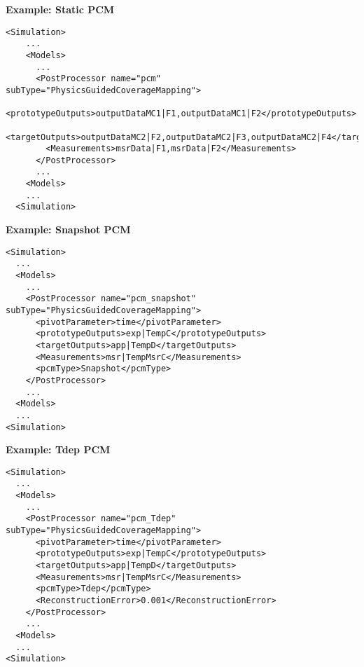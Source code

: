 \textbf{Example: Static PCM}
\begin{lstlisting}[style=XML,morekeywords={subType}]
  <Simulation>
    ...
    <Models>
      ...
      <PostProcessor name="pcm" subType="PhysicsGuidedCoverageMapping">
        <prototypeOutputs>outputDataMC1|F1,outputDataMC1|F2</prototypeOutputs>
        <targetOutputs>outputDataMC2|F2,outputDataMC2|F3,outputDataMC2|F4</targetOutputs>
        <Measurements>msrData|F1,msrData|F2</Measurements>
      </PostProcessor>
      ...
    <Models>
    ...
  <Simulation>
\end{lstlisting}

\textbf{Example: Snapshot PCM}
\begin{lstlisting}[style=XML,morekeywords={subType}]
<Simulation>
  ...
  <Models>
    ...
    <PostProcessor name="pcm_snapshot" subType="PhysicsGuidedCoverageMapping">
      <pivotParameter>time</pivotParameter>
      <prototypeOutputs>exp|TempC</prototypeOutputs>
      <targetOutputs>app|TempD</targetOutputs>
      <Measurements>msr|TempMsrC</Measurements>
      <pcmType>Snapshot</pcmType>
    </PostProcessor>
    ...
  <Models>
  ...
<Simulation>
\end{lstlisting}

\textbf{Example: Tdep PCM}
\begin{lstlisting}[style=XML,morekeywords={subType}]
<Simulation>
  ...
  <Models>
    ...
    <PostProcessor name="pcm_Tdep" subType="PhysicsGuidedCoverageMapping">
      <pivotParameter>time</pivotParameter>
      <prototypeOutputs>exp|TempC</prototypeOutputs>
      <targetOutputs>app|TempD</targetOutputs>
      <Measurements>msr|TempMsrC</Measurements>
      <pcmType>Tdep</pcmType>
      <ReconstructionError>0.001</ReconstructionError>
    </PostProcessor>
    ...
  <Models>
  ...
<Simulation>
\end{lstlisting}
